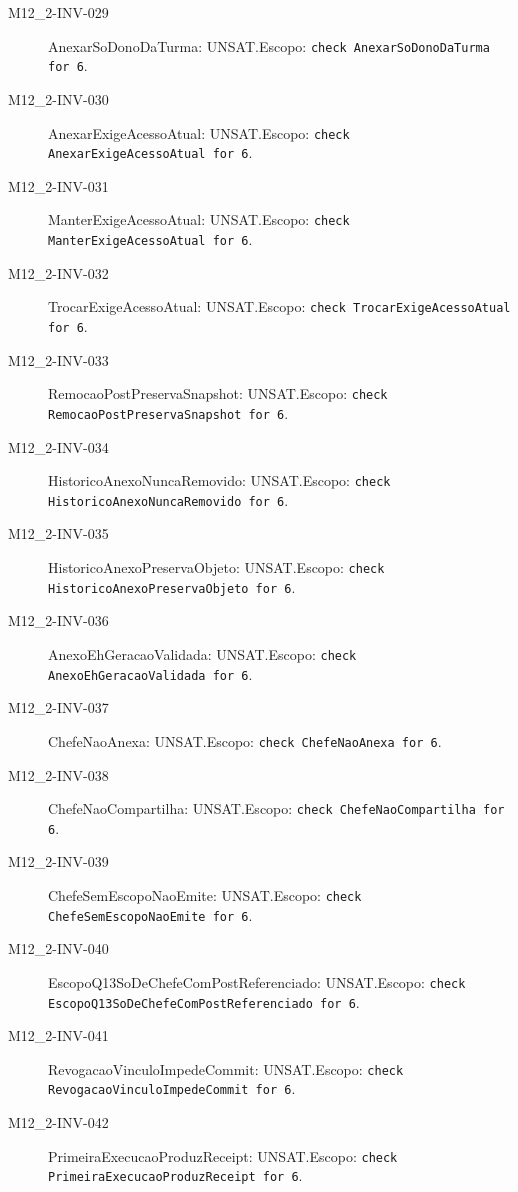\begin{description}
\item[M12\_2-INV-029] AnexarSoDonoDaTurma: UNSAT.\newline Escopo: \texttt{check AnexarSoDonoDaTurma for 6}.
\item[M12\_2-INV-030] AnexarExigeAcessoAtual: UNSAT.\newline Escopo: \texttt{check AnexarExigeAcessoAtual for 6}.
\item[M12\_2-INV-031] ManterExigeAcessoAtual: UNSAT.\newline Escopo: \texttt{check ManterExigeAcessoAtual for 6}.
\item[M12\_2-INV-032] TrocarExigeAcessoAtual: UNSAT.\newline Escopo: \texttt{check TrocarExigeAcessoAtual for 6}.
\item[M12\_2-INV-033] RemocaoPostPreservaSnapshot: UNSAT.\newline Escopo: \texttt{check RemocaoPostPreservaSnapshot for 6}.
\item[M12\_2-INV-034] HistoricoAnexoNuncaRemovido: UNSAT.\newline Escopo: \texttt{check HistoricoAnexoNuncaRemovido for 6}.
\item[M12\_2-INV-035] HistoricoAnexoPreservaObjeto: UNSAT.\newline Escopo: \texttt{check HistoricoAnexoPreservaObjeto for 6}.
\item[M12\_2-INV-036] AnexoEhGeracaoValidada: UNSAT.\newline Escopo: \texttt{check AnexoEhGeracaoValidada for 6}.
\item[M12\_2-INV-037] ChefeNaoAnexa: UNSAT.\newline Escopo: \texttt{check ChefeNaoAnexa for 6}.
\item[M12\_2-INV-038] ChefeNaoCompartilha: UNSAT.\newline Escopo: \texttt{check ChefeNaoCompartilha for 6}.
\item[M12\_2-INV-039] ChefeSemEscopoNaoEmite: UNSAT.\newline Escopo: \texttt{check ChefeSemEscopoNaoEmite for 6}.
\item[M12\_2-INV-040] EscopoQ13SoDeChefeComPostReferenciado: UNSAT.\newline Escopo: \texttt{check EscopoQ13SoDeChefeComPostReferenciado for 6}.
\item[M12\_2-INV-041] RevogacaoVinculoImpedeCommit: UNSAT.\newline Escopo: \texttt{check RevogacaoVinculoImpedeCommit for 6}.
\item[M12\_2-INV-042] PrimeiraExecucaoProduzReceipt: UNSAT.\newline Escopo: \texttt{check PrimeiraExecucaoProduzReceipt for 6}.

\end{description}
